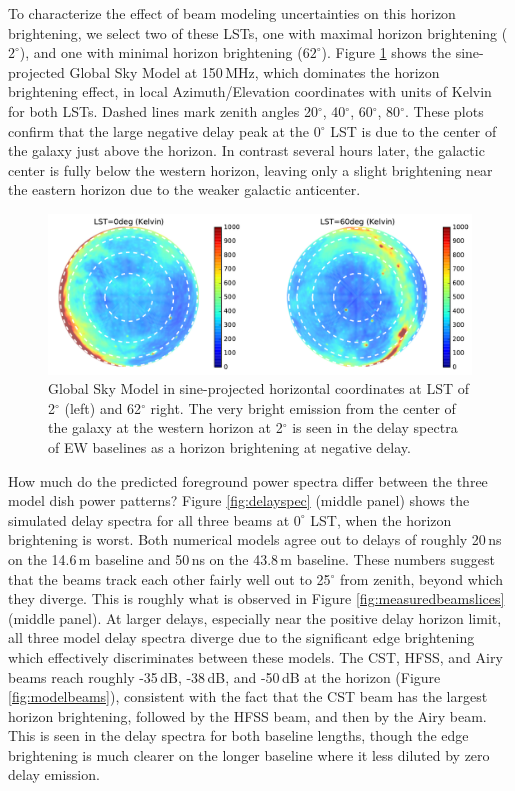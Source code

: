 \documentclass{emulateapj}
\begin{document}
To characterize the effect of beam modeling uncertainties on this horizon brightening, we select two of these LSTs, one with maximal horizon brightening ($2^\circ$), and one with minimal horizon brightening ($62^\circ$). Figure \ref{fig:gsmplots} shows the sine-projected Global Sky Model at 150\,MHz, which dominates the horizon brightening effect, in local Azimuth/Elevation coordinates with units of Kelvin for both LSTs. Dashed lines mark zenith angles 20$^\circ$, 40$^\circ$, 60$^\circ$, 80$^\circ$. These plots confirm that the large negative delay peak at the 0$^\circ$ LST is due to the center of the galaxy just above the horizon. In contrast several hours later, the galactic center is fully below the western horizon, leaving only a slight brightening near the eastern horizon due to the weaker galactic anticenter. 

\begin{figure}[h]
\centering
\includegraphics[width=6in]{gsm_kelvin_LST_2deg_and_62deg.pdf}
\caption{Global Sky Model \citep{gsm} in sine-projected horizontal coordinates at LST of 2$^\circ$ (left) and 62$^\circ$ right. The very bright emission from the center of the galaxy at the western horizon at 2$^\circ$ is seen in the delay spectra of EW baselines as a horizon brightening at negative delay.}
\label{fig:gsmplots}
\end{figure}

How much do the predicted foreground power spectra differ between the three model dish power patterns? Figure \ref{fig:delayspec} (middle panel) shows the simulated delay spectra for all three beams at $0^\circ$ LST, when the horizon brightening is worst. Both numerical models agree out to delays of roughly 20\,ns on the 14.6\,m baseline and 50\,ns on the 43.8\,m baseline. These numbers suggest that the beams track each other fairly well out to 25$^\circ$ from zenith, beyond which they diverge. This is roughly what is observed in Figure \ref{fig:measuredbeamslices} (middle panel). At larger delays, especially near the positive delay horizon limit, all three model delay spectra diverge due to the significant edge brightening which effectively discriminates between these models. The CST, HFSS, and Airy beams reach roughly -35\,dB, -38\,dB, and -50\,dB at the horizon (Figure \ref{fig:modelbeams}), consistent with the fact that the CST beam has the largest horizon brightening, followed by the HFSS beam, and then by the Airy beam. This is seen in the delay spectra for both baseline lengths, though the edge brightening is much clearer on the longer baseline where it less diluted by zero delay emission.  
\end{document}

